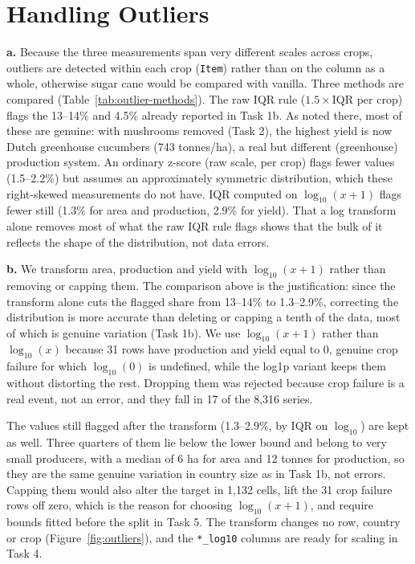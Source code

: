 \documentclass{article}
\begin{document}
\section{Handling Outliers}

\textbf{a.}
Because the three measurements span very different scales across crops, outliers are detected within each crop (\texttt{Item}) rather than on the column as a whole, otherwise sugar cane would be compared with vanilla. Three methods are compared (Table~\ref{tab:outlier-methods}). The raw IQR rule ($1.5\times$IQR per crop) flags the 13--14\% and 4.5\% already reported in Task 1b. As noted there, most of these are genuine: with mushrooms removed (Task 2), the highest yield is now Dutch greenhouse cucumbers (743 tonnes/ha), a real but different (greenhouse) production system. An ordinary z-score (raw scale, per crop) flags fewer values (1.5--2.2\%) but assumes an approximately symmetric distribution, which these right-skewed measurements do not have. IQR computed on $\log_{10}(x+1)$ flags fewer still (1.3\% for area and production, 2.9\% for yield). That a log transform alone removes most of what the raw IQR rule flags shows that the bulk of it reflects the shape of the distribution, not data errors.

\textbf{b.}
We transform area, production and yield with $\log_{10}(x+1)$ rather than removing or capping them. The comparison above is the justification: since the transform alone cuts the flagged share from 13--14\% to 1.3--2.9\%, correcting the distribution is more accurate than deleting or capping a tenth of the data, most of which is genuine variation (Task 1b). We use $\log_{10}(x+1)$ rather than $\log_{10}(x)$ because 31 rows have production and yield equal to 0, genuine crop failure for which $\log_{10}(0)$ is undefined, while the log1p variant keeps them without distorting the rest. Dropping them was rejected because crop failure is a real event, not an error, and they fall in 17 of the 8,316 series.

The values still flagged after the transform (1.3--2.9\%, by IQR on $\log_{10}$) are kept as well. Three quarters of them lie below the lower bound and belong to very small producers, with a median of 6 ha for area and 12 tonnes for production, so they are the same genuine variation in country size as in Task 1b, not errors. Capping them would also alter the target in 1,132 cells, lift the 31 crop failure rows off zero, which is the reason for choosing $\log_{10}(x+1)$, and require bounds fitted before the split in Task 5. The transform changes no row, country or crop (Figure~\ref{fig:outliers}), and the \texttt{*\_log10} columns are ready for scaling in Task 4.
\end{document}
